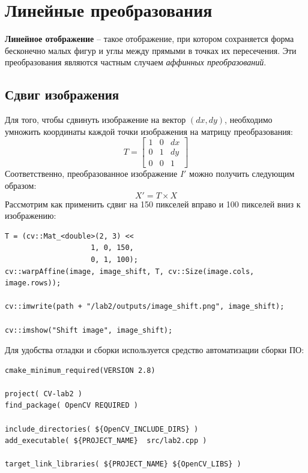 \section{Линейные преобразования}

\textbf{Линейное отображение} -- такое отображение, при котором сохраняется форма бесконечно малых фигур и углы между прямыми в точках их пересечения. 
Эти преобразования являются частным случаем \textit{аффинных преобразований}.

\subsection{Сдвиг изображения}

Для того, чтобы сдвинуть изображение на вектор $(dx, dy)$, необходимо умножить координаты каждой точки изображения на матрицу преобразования:
\begin{equation}
    T = \begin{bmatrix}
        1 & 0 & dx \\
        0 & 1 & dy \\
        0 & 0 & 1
    \end{bmatrix}
\end{equation}
Соответственно, преобразованное изображение $I'$ можно получить следующим образом:
\begin{equation}
    X' = T \times X
\end{equation}
Рассмотрим как применить сдвиг на 150 пикселей вправо и 100 пикселей вниз к изображению:

\begin{lstlisting}[style=cpp_white, caption={Исходный код для сдвига изображения}]
T = (cv::Mat_<double>(2, 3) << 
                    1, 0, 150, 
                    0, 1, 100); 
cv::warpAffine(image, image_shift, T, cv::Size(image.cols, image.rows));

cv::imwrite(path + "/lab2/outputs/image_shift.png", image_shift);

cv::imshow("Shift image", image_shift); 
\end{lstlisting}

Для удобства отладки и сборки используется средство автоматизации сборки ПО:
\begin{lstlisting}[style=cpp_white, caption={CMakeLists.txt для сборки проекта}]
cmake_minimum_required(VERSION 2.8)

project( CV-lab2 )
find_package( OpenCV REQUIRED )

include_directories( ${OpenCV_INCLUDE_DIRS} )
add_executable( ${PROJECT_NAME}  src/lab2.cpp )

target_link_libraries( ${PROJECT_NAME} ${OpenCV_LIBS} )
\end{lstlisting}

